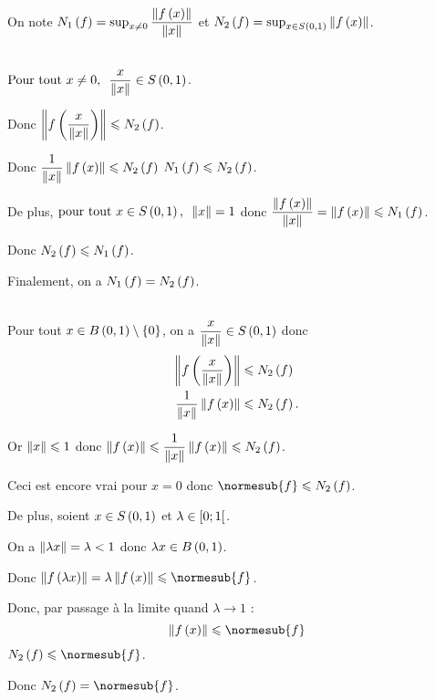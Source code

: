 \begin{dem}
On note \(N_1\paren{f}=\sup_{x\not=0}\dfrac{\norme{f\paren{x}}}{\norme{x}}\) et \(N_2\paren{f}=\sup_{x\in\sphere{0}{1}}\norme{f\paren{x}}\).
\end{dem}

\begin{dem}[\(N_1\paren{f}=N_2\paren{f}\)]~\\
\(\quantifs{\Tpt x\not=0}\dfrac{x}{\norme{x}}\in\sphere{0}{1}\).

Donc \(\norme{f\paren{\dfrac{x}{\norme{x}}}}\leq N_2\paren{f}\).

Donc \(\dfrac{1}{\norme{x}}\norme{f\paren{x}}\leq N_2\paren{f}\) \ie \(N_1\left(f\right)\leqslant N_2\left(f\right)\).

De plus, \(\quantifs{\tpt x\in\sphere{0}{1}}\norme{x}=1\) donc \(\dfrac{\norme{f\paren{x}}}{\norme{x}}=\norme{f\paren{x}}\leq N_1\paren{f}\).

Donc \(N_2\left(f\right)\leqslant N_1\left(f\right)\).

Finalement, on a \(N_1\paren{f}=N_2\paren{f}\).
\end{dem}

\begin{dem}[\(N_2\paren{f}=\normesub{f}\)]~\\
Pour tout \(x\in\bouleo{0}{1}\excluant\accol{0}\), on a \(\dfrac{x}{\norme{x}}\in\sphere{0}{1}\) donc \[\begin{aligned}
\norme{f\paren{\dfrac{x}{\norme{x}}}}&\leq N_2\paren{f} \\
\dfrac{1}{\norme{x}}\norme{f\paren{x}}&\leq N_2\paren{f}.
\end{aligned}\]

Or \(\norme{x}\leq1\) donc \(\norme{f\paren{x}}\leq\dfrac{1}{\norme{x}}\norme{f\paren{x}}\leq N_2\paren{f}\).

Ceci est encore vrai pour \(x=0\) donc \(\normesub{f}\leq N_2\paren{f}\).

De plus, soient \(x\in\sphere{0}{1}\) et \(\lambda\in\left[0;1\right[\).

On a \(\norme{\lambda x}=\lambda<1\) donc \(\lambda x\in\bouleo{0}{1}\).

Donc \(\norme{f\paren{\lambda x}}=\lambda\norme{f\paren{x}}\leq\normesub{f}\).

Donc, par passage à la limite quand \(\lambda\to1\) : \[\norme{f\paren{x}}\leq\normesub{f}\] \ie \(N_2\paren{f}\leq\normesub{f}\).

Donc \(N_2\paren{f}=\normesub{f}\).
\end{dem}

